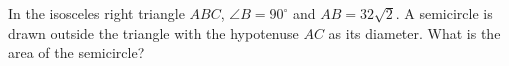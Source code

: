 In the isosceles right triangle $ABC$, $\angle B=90^\circ$ and $AB=32\sqrt2$. A semicircle is drawn outside the triangle with the hypotenuse $AC$ as its diameter. What is the area of the semicircle?
